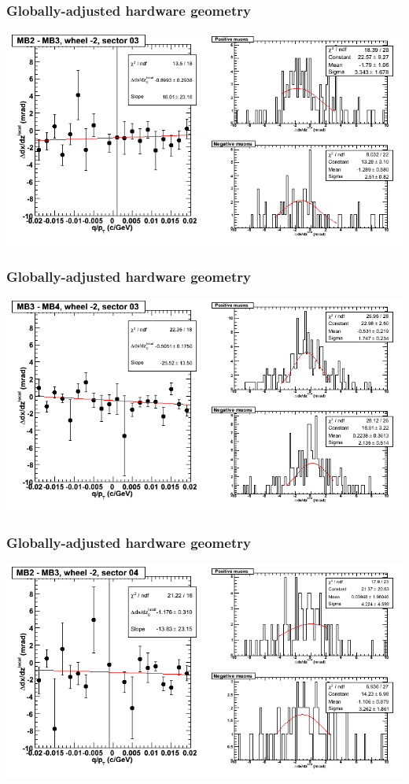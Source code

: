 \documentclass[compress]{beamer}
\begin{document}
\begin{frame}
\frametitle{Globally-adjusted hardware geometry}
\includegraphics[width=\linewidth]{NOV4_segdiffs_HW/dt13_slope_A_03_23.png}
\end{frame}

\begin{frame}
\frametitle{Globally-adjusted hardware geometry}
\includegraphics[width=\linewidth]{NOV4_segdiffs_HW/dt13_slope_A_03_34.png}
\end{frame}

\begin{frame}
\frametitle{Globally-adjusted hardware geometry}
\includegraphics[width=\linewidth]{NOV4_segdiffs_HW/dt13_slope_A_04_23.png}
\end{frame}
\end{document}
